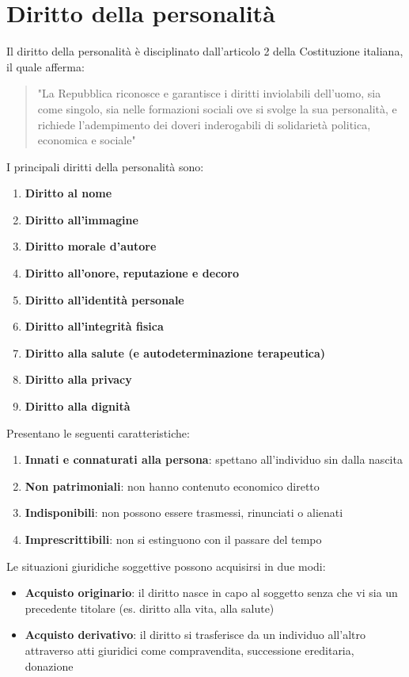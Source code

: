 \documentclass[10pt,oneside,a4paper]{article}
\begin{document}
	\section{Diritto della personalità}
	Il diritto della personalità è disciplinato dall'articolo 2 della Costituzione italiana, il quale afferma:
	\begin{quote}
		"La Repubblica riconosce e garantisce i diritti inviolabili dell'uomo, sia come singolo, sia nelle formazioni sociali ove si svolge la sua personalità, e richiede l'adempimento dei doveri inderogabili di solidarietà politica, economica e sociale"
	\end{quote}
	I principali diritti della personalità sono:  
	\begin{enumerate}
		\item \textbf{Diritto al nome}  
		\item \textbf{Diritto all'immagine}  
		\item \textbf{Diritto morale d'autore}  
		\item \textbf{Diritto all'onore, reputazione e decoro}  
		\item \textbf{Diritto all'identità personale}  
		\item \textbf{Diritto all'integrità fisica}  
		\item \textbf{Diritto alla salute (e autodeterminazione terapeutica)}  
		\item \textbf{Diritto alla privacy}  
		\item \textbf{Diritto alla dignità}  
	\end{enumerate}
	Presentano le seguenti caratteristiche:  
	\begin{enumerate}
		\item \textbf{Innati e connaturati alla persona}: spettano all'individuo sin dalla nascita
		\item \textbf{Non patrimoniali}: non hanno contenuto economico diretto
		\item \textbf{Indisponibili}: non possono essere trasmessi, rinunciati o alienati
		\item \textbf{Imprescrittibili}: non si estinguono con il passare del tempo
	\end{enumerate}
	Le situazioni giuridiche soggettive possono acquisirsi in due modi:  
	\begin{itemize}
		\item \textbf{Acquisto originario}: il diritto nasce in capo al soggetto senza che vi sia un precedente titolare (es. diritto alla vita, alla salute)
		\item \textbf{Acquisto derivativo}: il diritto si trasferisce da un individuo all'altro attraverso atti giuridici come compravendita, successione ereditaria, donazione
	\end{itemize}
\end{document}
